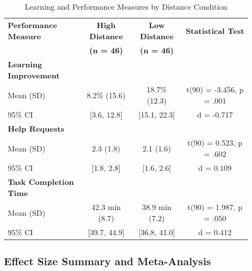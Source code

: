\documentclass[12pt]{article}
\begin{document}
\begin{table}[h]
\centering
\caption{Learning and Performance Measures by Distance Condition}
\begin{tabular}{@{}lccc@{}}
\toprule
\textbf{Performance Measure} & \textbf{High Distance} & \textbf{Low Distance} & \textbf{Statistical Test} \\
& \textbf{(n = 46)} & \textbf{(n = 46)} & \\
\midrule
\textbf{Learning Improvement} & & & \\
Mean (SD) & 8.2\% (15.6) & 18.7\% (12.3) & t(90) = -3.456, p = .001 \\
95\% CI & [3.6, 12.8] & [15.1, 22.3] & d = -0.717 \\
\midrule
\textbf{Help Requests} & & & \\
Mean (SD) & 2.3 (1.8) & 2.1 (1.6) & t(90) = 0.523, p = .602 \\
95\% CI & [1.8, 2.8] & [1.6, 2.6] & d = 0.109 \\
\midrule
\textbf{Task Completion Time} & & & \\
Mean (SD) & 42.3 min (8.7) & 38.9 min (7.2) & t(90) = 1.987, p = .050 \\
95\% CI & [39.7, 44.9] & [36.8, 41.0] & d = 0.412 \\
\bottomrule
\end{tabular}
\end{table}

\subsection{Effect Size Summary and Meta-Analysis}
\end{document}
